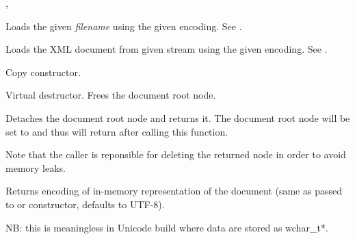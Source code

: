 
, 




\label{wxxmldocumentwxxmldocument}




Loads the given {\it filename} using the given encoding. See .


Loads the XML document from given stream using the given encoding. See .


Copy constructor.

\label{wxxmldocumentdtor}


Virtual destructor. Frees the document root node.


\label{wxxmldocumentdetachroot}


Detaches the document root node and returns it. The document root node will be set to \NULL
and thus  will return \false after calling this function.

Note that the caller is reponsible for deleting the returned node in order to avoid memory leaks.


\label{wxxmldocumentgetencoding}


Returns encoding of in-memory representation of the document
(same as passed to  or constructor, defaults to UTF-8).

NB: this is meaningless in Unicode build where data are stored as wchar\_t*.


\label{wxxmldocumentgetfileencoding}


